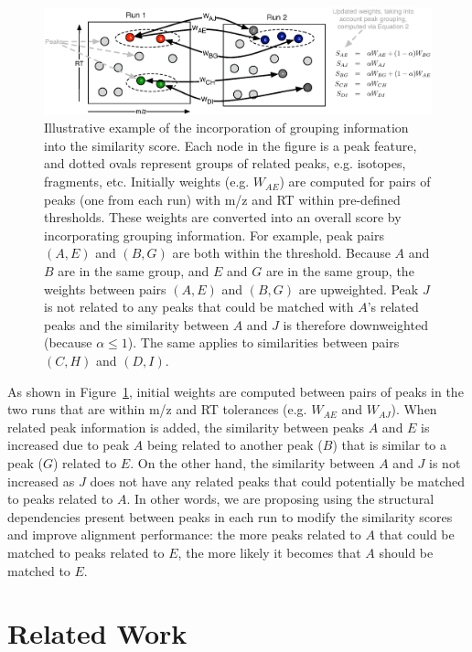 \begin{figure}[!htbp]
\centering\includegraphics[width=1\linewidth]{04-matching/figures/figure_1.eps}
\centering\caption{\label{fig:computingweight} Illustrative example of the incorporation of grouping information into the similarity score. Each node in the figure is a peak feature, and dotted ovals represent groups of related peaks, e.g. isotopes, fragments, etc. Initially weights (e.g. $W_{AE}$) are computed for pairs of peaks (one from each run) with m/z and RT within pre-defined thresholds. These weights are converted into an overall score by incorporating grouping information. For example, peak pairs $(A,E)$ and $(B,G)$ are both within the threshold. Because $A$ and $B$ are in the same group, and $E$ and $G$ are in the same group, the weights between pairs $(A,E)$ and $(B,G)$ are upweighted. Peak $J$ is not related to any peaks that could be matched with $A$'s related peaks and the similarity between $A$ and $J$ is therefore downweighted (because $\alpha\leq 1$). The same applies to similarities between pairs $(C,H)$ and $(D,I)$.}
\end{figure}

As shown in Figure~\ref{fig:computingweight}, initial weights are computed between pairs of peaks in the two runs that are within m/z and RT tolerances (e.g. $W_{AE}$ and $W_{AJ}$). When related peak information is added, the similarity between peaks $A$ and $E$ is increased due to peak $A$ being related to another peak ($B$) that is similar to a peak ($G$) related to $E$. On the other hand, the similarity between $A$ and $J$ is not increased as $J$ does not have any related peaks that could potentially be matched to peaks related to $A$. In other words, we are proposing using the structural dependencies present between peaks in each run to modify the similarity scores and improve alignment performance: the more peaks related to $A$ that could be matched to peaks related to $E$, the more likely it becomes that $A$ should be matched to $E$.

\section{Related Work}

